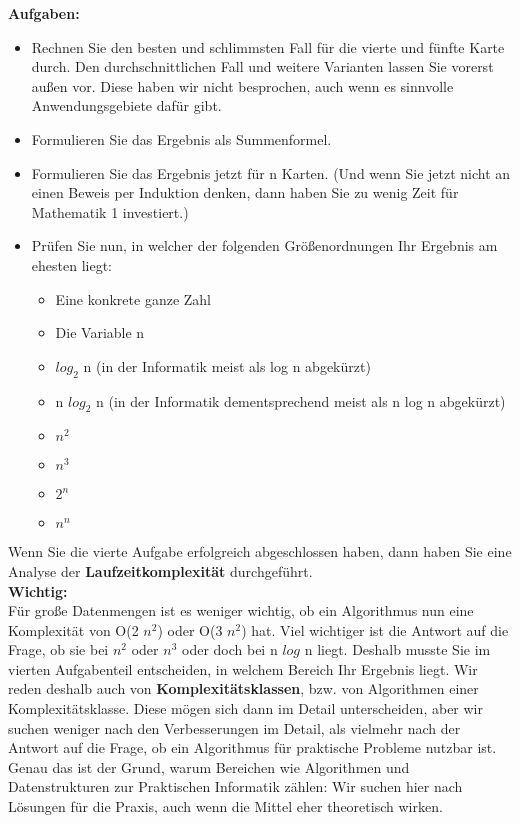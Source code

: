 \textbf{Aufgaben:}

\begin{itemize}
	\item Rechnen Sie den besten und schlimmsten Fall für die vierte und fünfte Karte durch. Den durchschnittlichen Fall und weitere Varianten lassen Sie vorerst außen vor. Diese haben wir nicht besprochen, auch wenn es sinnvolle Anwendungsgebiete dafür gibt.
	\item Formulieren Sie das Ergebnis als Summenformel.
	\item Formulieren Sie das Ergebnis jetzt für n Karten. (Und wenn Sie jetzt nicht an einen Beweis per Induktion denken, dann haben Sie zu wenig Zeit für Mathematik 1 investiert.)
	\item Prüfen Sie nun, in welcher der folgenden Größenordnungen Ihr Ergebnis am ehesten liegt:
	\begin{itemize}
		\item Eine konkrete ganze Zahl
		\item Die Variable n 
		\item \(log_2\) n (in der Informatik meist als log n abgekürzt)
		\item n \(log_2\) n (in der Informatik dementsprechend meist als n log n abgekürzt)
		\item \(n^2\)
		\item \(n^3\)
		\item \(2^n\) 
		\item \(n^n\)
	\end{itemize}
\end{itemize}

Wenn Sie die vierte Aufgabe erfolgreich abgeschlossen haben, dann haben Sie eine Analyse der \textbf{Laufzeitkomplexität} durchgeführt.\\

\textbf{Wichtig:}\\

Für große Datenmengen ist es weniger wichtig, ob ein Algorithmus nun eine Komplexität von O(2 \(n^2\)) oder O(3 \(n^2\)) hat. Viel wichtiger ist die Antwort auf die Frage, ob sie bei \(n^2\) oder \(n^3\) oder doch bei n \(log\) n liegt. Deshalb musste Sie im vierten Aufgabenteil entscheiden, in welchem Bereich Ihr Ergebnis liegt. Wir reden deshalb auch von \textbf{Komplexitätsklassen}, bzw. von Algorithmen einer Komplexitätsklasse. Diese mögen sich dann im Detail unterscheiden, aber wir suchen weniger nach den Verbesserungen im Detail, als vielmehr nach der Antwort auf die Frage, ob ein Algorithmus für praktische Probleme nutzbar ist. Genau das ist der Grund, warum Bereichen wie \glqq{}Algorithmen und Datenstrukturen\grqq{} zur Praktischen Informatik zählen: Wir suchen hier nach Lösungen für die Praxis, auch wenn die Mittel eher theoretisch wirken.\\

